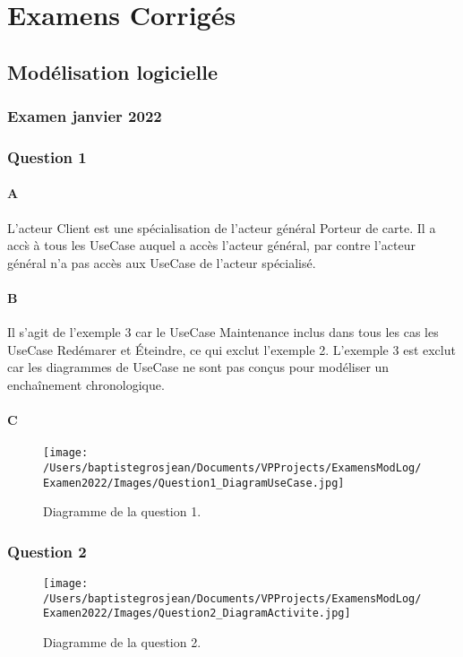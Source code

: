 \chapter{Examens Corrig\'es}\label{chap:examens}

\newpage
\section{Mod\'elisation logicielle}
\subsection{Examen janvier 2022}
\subsection*{Question 1}
\subsubsection*{A}
L'acteur Client est une sp\'ecialisation de l'acteur g\'en\'eral Porteur de carte. Il a acc\`s \`a tous les UseCase auquel a acc\`es l'acteur g\'en\'eral, par contre l'acteur g\'en\'eral n'a pas acc\`es aux UseCase de l'acteur sp\'ecialis\'e.
\subsubsection*{B}
Il s'agit de l'exemple 3 car le UseCase Maintenance inclus dans tous les cas les UseCase Red\'emarer et \'Eteindre, ce qui exclut l'exemple 2. L'exemple 3 est exclut car les diagrammes de UseCase ne sont pas conçus pour mod\'eliser un encha\^inement chronologique.
\subsubsection*{C}
\begin{figure}[H]
	\centering
	\texttt{[image: /Users/baptistegrosjean/Documents/VPProjects/ExamensModLog/Examen2022/Images/Question1\_DiagramUseCase.jpg]}
	\caption{Diagramme de la question 1.}
\end{figure}
\subsection*{Question 2}
\begin{figure}[H]
	\centering
	\texttt{[image: /Users/baptistegrosjean/Documents/VPProjects/ExamensModLog/Examen2022/Images/Question2\_DiagramActivite.jpg]}
	\caption{Diagramme de  la question 2.}
\end{figure}
